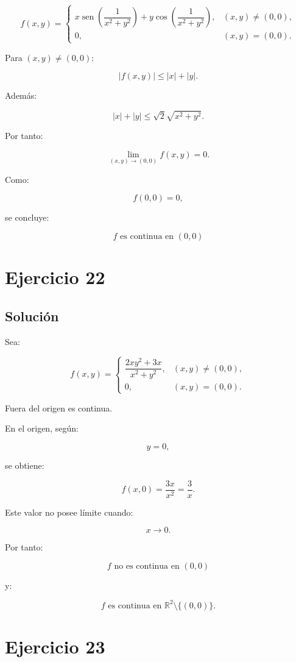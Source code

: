 \documentclass[11pt,a4paper]{article}
\newcommand{\R}{\mathbb{R}}
\newcommand{\sen}{\operatorname{sen}}
\begin{document}
\[
f(x,y)
=
\begin{cases}
x\sen\left(\dfrac1{x^2+y^2}\right)
+
y\cos\left(\dfrac1{x^2+y^2}\right),
&
(x,y)\neq(0,0),\\[2mm]
0,
&
(x,y)=(0,0).
\end{cases}
\]

Para \((x,y)\neq(0,0)\):

\[
|f(x,y)|
\leq
|x|+|y|.
\]

Además:

\[
|x|+|y|
\leq
\sqrt2\sqrt{x^2+y^2}.
\]

Por tanto:

\[
\lim_{(x,y)\to(0,0)}f(x,y)=0.
\]

Como:

\[
f(0,0)=0,
\]

se concluye:

\[
\boxed{
f\text{ es continua en }(0,0)
}
\]

\section{Ejercicio 22}
\subsection{Solución}

Sea:

\[
f(x,y)
=
\begin{cases}
\dfrac{2xy^2+3x}{x^2+y^2},
&
(x,y)\neq(0,0),\\[2mm]
0,
&
(x,y)=(0,0).
\end{cases}
\]

Fuera del origen es continua.

En el origen, según:

\[
y=0,
\]

se obtiene:

\[
f(x,0)
=
\frac{3x}{x^2}
=
\frac3x.
\]

Este valor no posee límite cuando:

\[
x\to0.
\]

Por tanto:

\[
\boxed{
f\text{ no es continua en }(0,0)
}
\]

y:

\[
\boxed{
f\text{ es continua en }
\R^2\setminus\{(0,0)\}.
}
\]

\section{Ejercicio 23}
\end{document}
